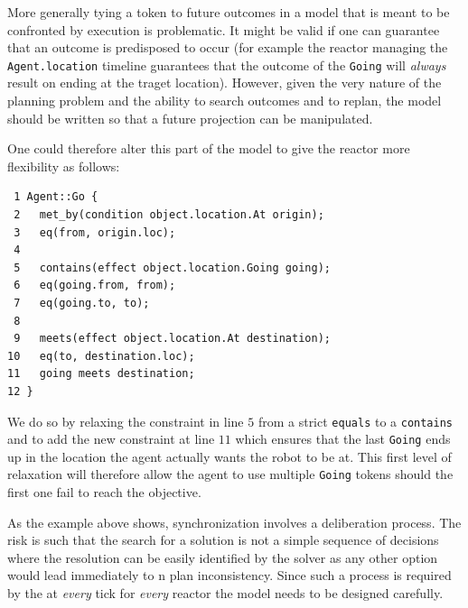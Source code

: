 More generally tying a token to future outcomes in a model that is
meant to be confronted by execution is problematic. It might be valid
if one can guarantee that an outcome is predisposed to occur (for
example the reactor managing the \texttt{Agent.location} timeline
guarantees that the outcome of the \texttt{Going} will {\em always}
result on ending at the traget location). However, given the very
nature of the planning problem and the ability to search outcomes and
to replan, the model should be written so that a future projection can
be manipulated. 

One could therefore alter this part of the model to give the reactor
more flexibility as follows:

\begin{verbatim}
 1 Agent::Go {
 2   met_by(condition object.location.At origin);
 3   eq(from, origin.loc);
 4
 5   contains(effect object.location.Going going);
 6   eq(going.from, from);
 7   eq(going.to, to);
 8   
 9   meets(effect object.location.At destination);
10   eq(to, destination.loc);
11   going meets destination;
12 }
\end{verbatim}

We do so by relaxing the constraint in line $5$ from a strict
\texttt{equals} to a \texttt{contains} and to add the new constraint
at line $11$ which ensures that the last \texttt{Going} ends up in the
location the agent actually wants the robot to be at. This first level
of relaxation will therefore allow the agent to use multiple
\texttt{Going} tokens should the first one fail to reach the
objective.  

As the example above shows, synchronization involves a deliberation
process. The risk is such that the search for a solution is not a
simple sequence of decisions where the resolution can be easily
identified by the solver as any other option would lead immediately to
n plan inconsistency. Since such a process is required by the \rx at
\emph{every} tick for \emph{every} reactor the model needs to be
designed carefully.

